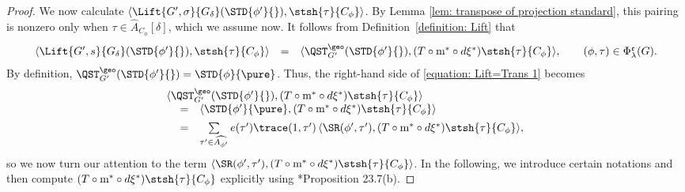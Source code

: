 \documentclass[11pt,letterpaper]{amsart}
\newcommand{\calm}{\textrm{m}}
\numberwithin{equation}{section}
\begin{document}
\begin{proof}
We now calculate $\langle \Lift{G',\sigma}{G_\delta}(\STD{\phi'}{}), \stsh{\tau}{C_{\phi}} \rangle$. By Lemma \ref{lem: transpose of projection standard}, this pairing is nonzero only when $\tau \in \widehat{A}_{C_{\phi}}[\delta]$, which we assume now. It follows from Definition~\ref{definition: Lift} that
\begin{equation}\label{equation: Lift=Trans 1}
    \begin{array}{rcl}
    \langle \Lift{G',s}{G_\delta}(\STD{\phi'}{}), \stsh{\tau}{C_{\phi}} \rangle
    &=&
    \langle \QST_{G'}^{\geo}(\STD{\phi'}{}), (T \circ \calm^{\ast}\circ d\xi^*)\stsh{\tau}{C_{\phi}} \rangle,
    \qquad (\phi,\tau) \in \Phi^\mathfrak{e}_{\lambda}(G).
    \end{array}
\end{equation}
By definition,
$\QST_{G'}^{\geo}(\STD{\phi'}{}) = \STD{\phi}{\pure}$.
Thus, the right-hand side of \eqref{equation: Lift=Trans 1} becomes
\begin{equation}\label{equation: Lift=Trans 2}
    \begin{array}{rcl}
    &&
    \hskip-30pt \langle \QST_{G'}^{\geo}(\STD{\phi'}{}), (T\circ \calm^{\ast} \circ  d\xi^*)\stsh{\tau}{C_{\phi}} \rangle \\
    &=& 
    \langle \STD{\phi'}{\pure}, (T\circ \calm^{\ast} \circ  d\xi^*)\stsh{\tau}{C_{\phi}} \rangle \vspace{0.5em} \\
    &=&
    \sum\limits_{\tau'\in \widehat{A_{\phi'}}} e(\tau') \trace(1,\tau')\,
    \langle \SR(\phi',\tau'), (T\circ \calm^{\ast} \circ  d\xi^*)\stsh{\tau}{C_{\phi}}\rangle,
    \end{array}
\end{equation}
so we now turn our attention to the term $\langle \SR(\phi',\tau'), (T\circ \calm^{\ast} \circ  d\xi^*)\stsh{\tau}{C_{\phi}} \rangle$.
In the following, we introduce certain notations and then compute $(T \circ \calm^{\ast} \circ  d\xi^*)\stsh{\tau}{C_{\phi}}$ explicitly using \cite{ABV92}*{Proposition 23.7(b)}. 


\end{proof}
\end{document}
